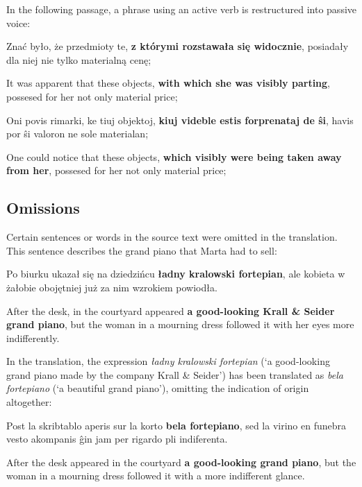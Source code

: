 In the following passage, a phrase using an active verb is restructured into passive voice:

\begin{displayquote}
Znać było, że przedmioty te, \textbf{z którymi rozstawała się widocznie}, posiadały dla niej nie tylko materialną cenę;
\end{displayquote}

It was apparent that these objects, \textbf{with which she was visibly parting}, possesed for her not only material price;

\begin{displayquote}
Oni povis rimarki, ke tiuj objektoj, \textbf{kiuj videble estis forprenataj de ŝi}, havis por ŝi valoron ne sole materialan;
\end{displayquote}

One could notice that these objects, \textbf{which visibly were being taken away from her}, possesed for her not only material price;

\subsection{Omissions}

Certain sentences or words in the source text were omitted in the translation.
This sentence describes the grand piano that Marta had to sell:

\begin{displayquote}
Po biurku ukazał się na dziedzińcu \textbf{ładny kralowski fortepian}, ale kobieta w żałobie obojętniej już za nim wzrokiem powiodła.
\end{displayquote}

After the desk, in the courtyard appeared \textbf{a good-looking Krall \& Seider grand piano}, but the woman in a mourning dress followed it with her eyes more indifferently.

In the translation, the expression \textit{ładny kralowski fortepian} (`a good-looking grand piano made by the company Krall \& Seider') has been translated as \textit{bela fortepiano} (`a beautiful grand piano'), omitting the indication of origin altogether:

\begin{displayquote}
Post la skribtablo aperis sur la korto \textbf{bela fortepiano}, sed la virino en funebra vesto akompanis ĝin jam per rigardo pli indiferenta.
\end{displayquote}

After the desk appeared in the courtyard \textbf{a good-looking grand piano}, but the woman in a mourning dress followed it with a more indifferent glance.

